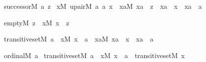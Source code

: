 \begin{isabelle}%
successor{\isacharparenleft}{\kern0pt}M{\isacharcomma}{\kern0pt}\ a{\isacharcomma}{\kern0pt}\ z{\isacharparenright}{\kern0pt}\ {\isasymequiv}\isanewline
{\isasymexists}x{\isacharbrackleft}{\kern0pt}M{\isacharbrackright}{\kern0pt}{\isachardot}{\kern0pt}\ upair{\isacharparenleft}{\kern0pt}M{\isacharcomma}{\kern0pt}\ a{\isacharcomma}{\kern0pt}\ a{\isacharcomma}{\kern0pt}\ x{\isacharparenright}{\kern0pt}\ {\isasymand}\ {\isacharparenleft}{\kern0pt}{\isasymforall}xa{\isacharbrackleft}{\kern0pt}M{\isacharbrackright}{\kern0pt}{\isachardot}{\kern0pt}\ xa\ {\isasymin}\ z\ {\isasymlongleftrightarrow}\ xa\ {\isasymin}\ x\ {\isasymor}\ xa\ {\isasymin}\ a{\isacharparenright}{\kern0pt}%
\end{isabelle}%
\begin{isabelle}%
empty{\isacharparenleft}{\kern0pt}M{\isacharcomma}{\kern0pt}\ z{\isacharparenright}{\kern0pt}\ {\isasymequiv}\ {\isasymforall}x{\isacharbrackleft}{\kern0pt}M{\isacharbrackright}{\kern0pt}{\isachardot}{\kern0pt}\ x\ {\isasymnotin}\ z%
\end{isabelle}%
\begin{isabelle}%
transitive{\isacharunderscore}{\kern0pt}set{\isacharparenleft}{\kern0pt}M{\isacharcomma}{\kern0pt}\ a{\isacharparenright}{\kern0pt}\ {\isasymequiv}\ {\isasymforall}x{\isacharbrackleft}{\kern0pt}M{\isacharbrackright}{\kern0pt}{\isachardot}{\kern0pt}\ x\ {\isasymin}\ a\ {\isasymlongrightarrow}\ {\isacharparenleft}{\kern0pt}{\isasymforall}xa{\isacharbrackleft}{\kern0pt}M{\isacharbrackright}{\kern0pt}{\isachardot}{\kern0pt}\ xa\ {\isasymin}\ x\ {\isasymlongrightarrow}\ xa\ {\isasymin}\ a{\isacharparenright}{\kern0pt}%
\end{isabelle}%
\begin{isabelle}%
ordinal{\isacharparenleft}{\kern0pt}M{\isacharcomma}{\kern0pt}\ a{\isacharparenright}{\kern0pt}\ {\isasymequiv}\isanewline
transitive{\isacharunderscore}{\kern0pt}set{\isacharparenleft}{\kern0pt}M{\isacharcomma}{\kern0pt}\ a{\isacharparenright}{\kern0pt}\ {\isasymand}\ {\isacharparenleft}{\kern0pt}{\isasymforall}x{\isacharbrackleft}{\kern0pt}M{\isacharbrackright}{\kern0pt}{\isachardot}{\kern0pt}\ x\ {\isasymin}\ a\ {\isasymlongrightarrow}\ transitive{\isacharunderscore}{\kern0pt}set{\isacharparenleft}{\kern0pt}M{\isacharcomma}{\kern0pt}\ x{\isacharparenright}{\kern0pt}{\isacharparenright}{\kern0pt}%
\end{isabelle}%
